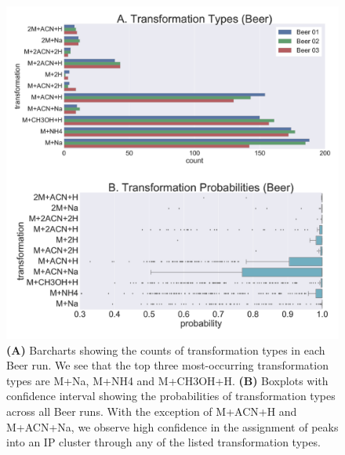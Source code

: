 \begin{figure}[!htbp]
\centering
\includegraphics[width=1.0\linewidth]{05-precursor-cluster/figures/trans_Beer.pdf}
\caption{\label{fig:trans-beer} \textbf{(A)} Barcharts showing the counts of transformation types in each Beer run. We see that the top three most-occurring transformation types are M+Na, M+NH4 and M+CH3OH+H. \textbf{(B)} Boxplots with confidence interval showing the probabilities of transformation types across all Beer runs. With the exception of M+ACN+H and M+ACN+Na, we observe high confidence in the assignment of peaks into an IP cluster through any of the listed transformation types.}
\end{figure}

